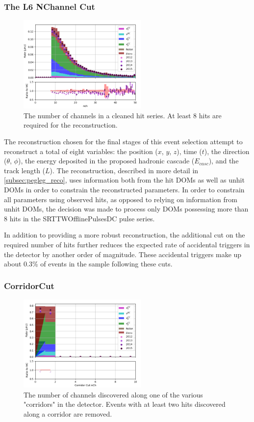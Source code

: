 \subsubsection{The L6 NChannel Cut}
\begin{figure}[h]
	\centering
		\includegraphics[width=2.5in]{nch.png}
		\caption[The NChannel Distribution]{The number of channels in a cleaned hit series. At least 8 hits are required for the reconstruction.}
	\label{fig:nchannel}
\end{figure}

The reconstruction chosen for the final stages of this event selection attempt to reconstruct a total of eight variables: the position ($x$, $y$, $z$), time ($t$), the direction ($\theta$, $\phi$), the energy deposited in the proposed hadronic cascade ($E_{casc}$), and the track length ($L$).
The reconstruction, described in more detail in \ref{subsec:pegleg_reco}, uses information both from the hit DOMs as well as unhit DOMs in order to constrain the reconstructed parameters.
In order to constrain all parameters using observed hits, as opposed to relying on information from unhit DOMs, the decision was made to process only DOMs possessing more than 8 hits in the SRTTWOfflinePulsesDC pulse series.

In addition to providing a more robust reconstruction, the additional cut on the required number of hits further reduces the expected rate of accidental triggers in the detector by another order of magnitude.
These accidental triggers make up about 0.3\% of events in the sample following these cuts.


\label{subsubsec:corridorcut}
\subsubsection{CorridorCut}
\begin{figure}[h]
	\centering
		\includegraphics[width=2.5in]{Corridor_Cut_nCh.png}
		\caption[CorridorCut Distribution]{The number of channels discovered along one of the various "corridors" in the detector. Events with at least two hits discovered along a corridor are removed.}
	\label{fig:corridorcut}
\end{figure}

